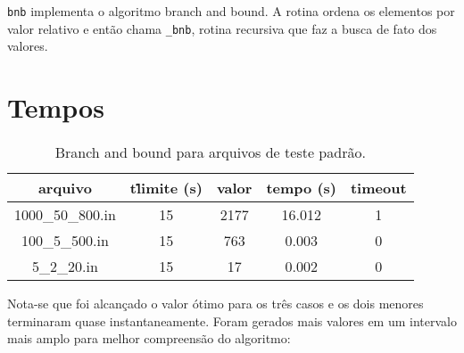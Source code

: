 \documentclass[7pt]{article}
\newcommand{\ttt}[1]{\texttt{#1}}
\begin{document}
\begin{multicols}{2}
\ttt{bnb} implementa o algoritmo branch and bound. A rotina ordena os
elementos por valor relativo e então chama \ttt{\_bnb}, rotina recursiva que
faz a busca de fato dos valores.

\section{Tempos}
\begin{table}[H]
\centering
\setlength{\tabcolsep}{.16667em}
\caption{Branch and bound para arquivos de teste padrão.}
\begin{tabular}{|c|c|c|c|c|}
    \hline
    arquivo & t\. limite (s) & valor & tempo (s) & timeout\\
    \hline
    1000\_50\_800.in & 15 & 2177 & 16.012 & 1\\
    \hline
    100\_5\_500.in & 15 & 763 & 0.003 & 0\\
    \hline
    5\_2\_20.in & 15 & 17 & 0.002 & 0\\
    \hline
\end{tabular}
\end{table}

Nota-se que foi alcançado o valor ótimo para os três casos e os dois menores
terminaram quase instantaneamente.
Foram gerados mais valores em um intervalo mais amplo para melhor compreensão
do algoritmo:
\end{multicols}
\end{document}
